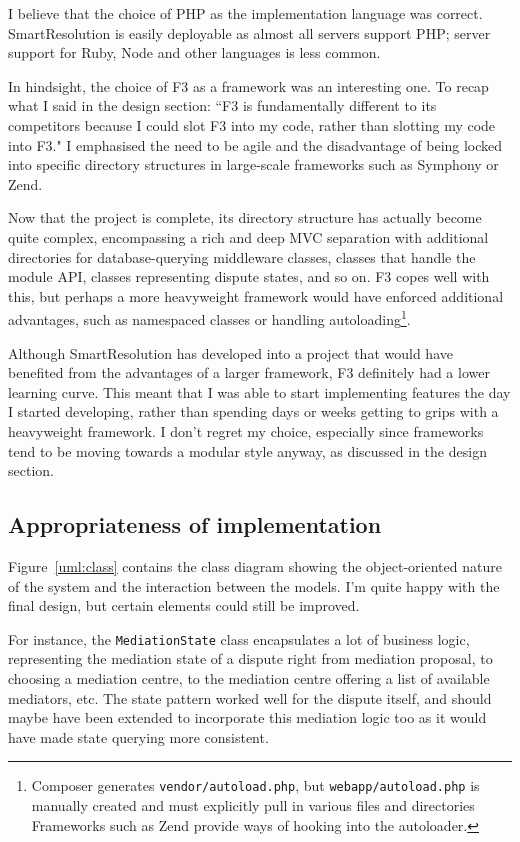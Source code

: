 I believe that the choice of PHP as the implementation language was correct. SmartResolution is easily deployable as almost all servers support PHP; server support for Ruby, Node and other languages is less common.

In hindsight, the choice of F3 as a framework was an interesting one. To recap what I said in the design section: ``F3 is fundamentally different to its competitors because I could slot F3 into my code, rather than slotting my code into F3." I emphasised the need to be agile and the disadvantage of being locked into specific directory structures in large-scale frameworks such as Symphony or Zend.

Now that the project is complete, its directory structure has actually become quite complex, encompassing a rich and deep MVC separation with additional directories for database-querying middleware classes, classes that handle the module API, classes representing dispute states, and so on. F3 copes well with this, but perhaps a more heavyweight framework would have enforced additional advantages, such as namespaced classes or handling autoloading\footnote{Composer generates \lstinline{vendor/autoload.php}, but \lstinline{webapp/autoload.php} is manually created and must explicitly pull in various files and directories Frameworks such as Zend provide ways of hooking into the autoloader.}.

Although SmartResolution has developed into a project that would have benefited from the advantages of a larger framework, F3 definitely had a lower learning curve. This meant that I was able to start implementing features the day I started developing, rather than spending days or weeks getting to grips with a heavyweight framework. I don't regret my choice, especially since frameworks tend to be moving towards a modular style anyway, as discussed in the design section.

\subsection{Appropriateness of implementation}

Figure~\ref{uml:class} contains the class diagram showing the object-oriented nature of the system and the interaction between the models. I'm quite happy with the final design, but certain elements could still be improved.

For instance, the \lstinline{MediationState} class encapsulates a lot of business logic, representing the mediation state of a dispute right from mediation proposal, to choosing a mediation centre, to the mediation centre offering a list of available mediators, etc. The state pattern worked well for the dispute itself, and should maybe have been extended to incorporate this mediation logic too as it would have made state querying more consistent.

